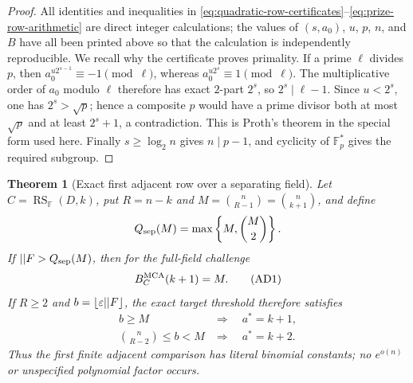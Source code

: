 \documentclass[11pt,a4paper]{amsart}
\numberwithin{equation}{section}
\newtheorem{theorem}{Theorem}[section]
\theoremstyle{remark}
\DeclareMathOperator{\RS}{RS}\DeclareMathOperator{\MCA}{MCA}\DeclareMathOperator{\CA}{CA}
\newcommand{\F}{\mathbb F}\newcommand{\B}{\mathbb B}\newcommand{\K}{\mathbb K}\newcommand{\Z}{\mathbb Z}
\begin{document}
\begin{proof}
All identities and inequalities in
\eqref{eq:quadratic-row-certificates}--\eqref{eq:prize-row-arithmetic}
are direct
integer calculations; the values of \((s,a_0)\), \(u\), \(p\), \(n\),
and \(B\) have all been printed above so that the calculation is
independently reproducible.  We recall why the certificate proves
primality.  If a prime \(\ell\) divides \(p\), then
\(a_0^{u2^{s-1}}\equiv-1\pmod\ell\), whereas
\(a_0^{u2^s}\equiv1\pmod\ell\).  The multiplicative order of \(a_0\)
modulo \(\ell\) therefore has exact \(2\)-part \(2^s\), so
\(2^s\mid\ell-1\).  Since \(u<2^s\), one has \(2^s>\sqrt p\); hence a
composite \(p\) would have a prime divisor both at most \(\sqrt p\) and
at least \(2^s+1\), a contradiction.  This is Proth's theorem in the
special form used here.  Finally \(s\ge\log_2 n\) gives \(n\mid p-1\),
and cyclicity of \(\F_p^*\) gives the required subgroup.
\end{proof}

\begin{theorem}[Exact first adjacent row over a separating field]
\label{thm:exact-first-adjacent-row}
Let \(C=\RS_\F(D,k)\), put \(R=n-k\) and
\(M=\binom n{R-1}=\binom n{k+1}\), and define
\[
                    Q_{\rm sep}(M)=\max\left\{M,\binom M2\right\}.
\]
If \(\abs\F>Q_{\rm sep}(M)\), then for the full-field challenge
\[
                         B_C^{\rm MCA}(k+1)=M.      \tag{AD1}
\]
If \(R\ge2\) and \(b=\floor{\eps\abs\F}\), the exact target threshold
therefore satisfies
\[
 \begin{array}{ll}
 b\ge M &\Longrightarrow\quad a^*=k+1,\\
 \displaystyle\binom n{R-2}\le b<M
   &\Longrightarrow\quad a^*=k+2.
 \end{array}                                       \tag{AD2}
\]
Thus the first finite adjacent comparison has literal binomial constants;
no \(e^{o(n)}\) or unspecified polynomial factor occurs.
\end{theorem}
\end{document}

